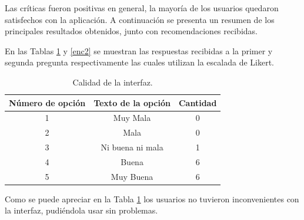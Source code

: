 \documentclass[12pt]{article}
\begin{document}
Las críticas fueron positivas en general, la mayoría de los usuarios quedaron satisfechos con la aplicación. A continuación se presenta un resumen de los principales resultados obtenidos, junto con recomendaciones recibidas.

En las Tablas \ref{enc1} y \ref{enc2} se muestran las respuestas recibidas a la primer y segunda pregunta respectivamente las cuales utilizan la escalada de Likert.
\begin{table}[h!]
  \centering
  \begin{tabular}{ccc}
    \toprule
    Número de opción &  Texto de la opción &Cantidad\\
    \midrule
    1 & Muy Mala & 0 \\
    2 & Mala & 0 \\
    3 & Ni buena ni mala & 1 \\
    4 & Buena & 6\\
    5 & Muy Buena & 6\\
    \bottomrule
  \end{tabular}
  \caption{Calidad de la interfaz.}
  \label{enc1}
\end{table}

Como se puede apreciar en la Tabla \ref{enc1} los usuarios no tuvieron inconvenientes con la interfaz, pudiéndola usar sin problemas.
\end{document}
